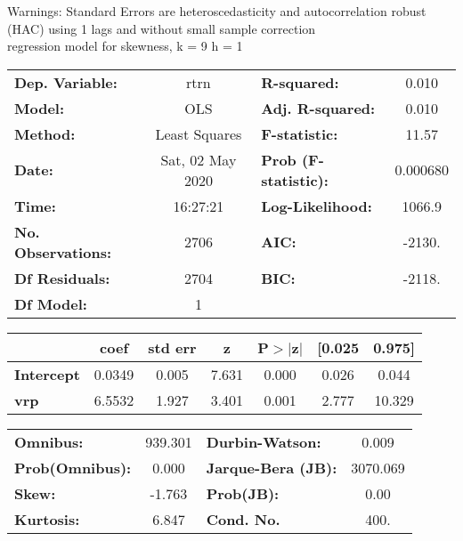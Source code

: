 Warnings: \newline
 [1] Standard Errors are heteroscedasticity and autocorrelation robust (HAC) using 1 lags and without small sample correction\\ 

regression model for skewness, k = 9 h = 1\begin{center}
\begin{tabular}{lclc}
\toprule
\textbf{Dep. Variable:}    &       rtrn       & \textbf{  R-squared:         } &     0.010   \\
\textbf{Model:}            &       OLS        & \textbf{  Adj. R-squared:    } &     0.010   \\
\textbf{Method:}           &  Least Squares   & \textbf{  F-statistic:       } &     11.57   \\
\textbf{Date:}             & Sat, 02 May 2020 & \textbf{  Prob (F-statistic):} &  0.000680   \\
\textbf{Time:}             &     16:27:21     & \textbf{  Log-Likelihood:    } &    1066.9   \\
\textbf{No. Observations:} &        2706      & \textbf{  AIC:               } &    -2130.   \\
\textbf{Df Residuals:}     &        2704      & \textbf{  BIC:               } &    -2118.   \\
\textbf{Df Model:}         &           1      & \textbf{                     } &             \\
\bottomrule
\end{tabular}
\begin{tabular}{lcccccc}
                   & \textbf{coef} & \textbf{std err} & \textbf{z} & \textbf{P$> |$z$|$} & \textbf{[0.025} & \textbf{0.975]}  \\
\midrule
\textbf{Intercept} &       0.0349  &        0.005     &     7.631  &         0.000        &        0.026    &        0.044     \\
\textbf{vrp}       &       6.5532  &        1.927     &     3.401  &         0.001        &        2.777    &       10.329     \\
\bottomrule
\end{tabular}
\begin{tabular}{lclc}
\textbf{Omnibus:}       & 939.301 & \textbf{  Durbin-Watson:     } &    0.009  \\
\textbf{Prob(Omnibus):} &   0.000 & \textbf{  Jarque-Bera (JB):  } & 3070.069  \\
\textbf{Skew:}          &  -1.763 & \textbf{  Prob(JB):          } &     0.00  \\
\textbf{Kurtosis:}      &   6.847 & \textbf{  Cond. No.          } &     400.  \\
\bottomrule
\end{tabular}
\end{center}

